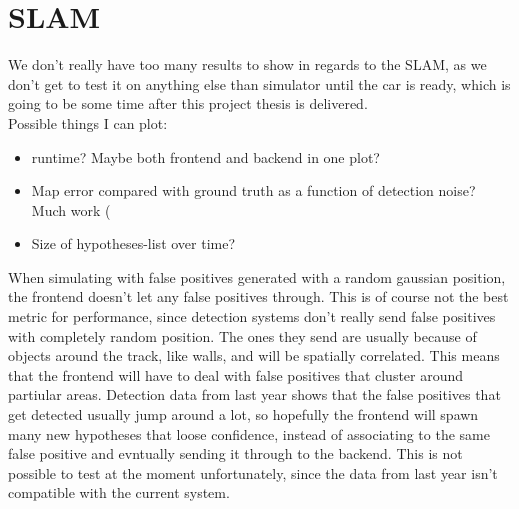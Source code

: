 \section{SLAM}

We don't really have too many results to show in regards to the SLAM, as we don't get to test it on anything else than simulator until the car is ready, which is going to be some time after this project thesis is delivered. \\

Possible things I can plot:
\begin{itemize}
    \item runtime? Maybe both frontend and backend in one plot?
    \item Map error compared with ground truth as a function of detection noise? Much work \:(
    \item Size of hypotheses-list over time?
\end{itemize}

When simulating with false positives generated with a random gaussian position, the frontend doesn't let any false positives through. This is of course not the best metric for performance, since detection systems don't really send false positives with completely random position. The ones they send are usually because of objects around the track, like walls, and will be spatially correlated. This means that the frontend will have to deal with false positives that cluster around partiular areas. Detection data from last year shows that the false positives that get detected usually jump around a lot, so hopefully the frontend will spawn many new hypotheses that loose confidence, instead of associating to the same false positive and evntually sending it through to the backend. This is not possible to test at the moment unfortunately, since the data from last year isn't compatible with the current system. \\

